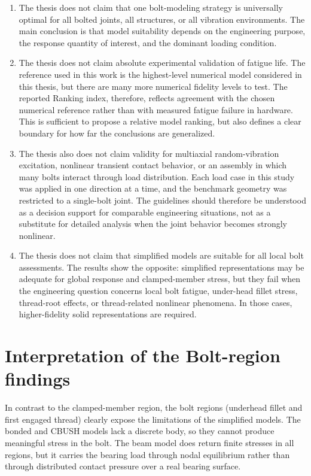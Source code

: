 \documentclass[a4paper,twoside]{bth}
\begin{document}
\begin{enumerate}
    \item The thesis does not claim that one bolt-modeling strategy is universally optimal for all bolted joints, all structures, or all vibration environments. The main conclusion is that model suitability depends on the engineering purpose, the response quantity of interest, and the dominant loading condition.
    \item The thesis does not claim absolute experimental validation of fatigue life. The reference used in this work is the highest-level numerical model considered in this thesis, but there are many more numerical fidelity levels to test. The reported Ranking index, therefore, reflects agreement with the chosen numerical reference rather than with measured fatigue failure in hardware. This is sufficient to propose a relative model ranking, but also defines a clear boundary for how far the conclusions are generalized.
    \item The thesis also does not claim validity for multiaxial random-vibration excitation, nonlinear transient contact behavior, or an assembly in which many bolts interact through load distribution. Each load case in this study was applied in one direction at a time, and the benchmark geometry was restricted to a single-bolt joint. The guidelines should therefore be understood as a decision support for comparable engineering situations, not as a substitute for detailed analysis when the joint behavior becomes strongly nonlinear.
    \item The thesis does not claim that simplified models are suitable for all local bolt assessments. The results show the opposite: simplified representations may be adequate for global response and clamped-member stress, but they fail when the engineering question concerns local bolt fatigue, under-head fillet stress, thread-root effects, or thread-related nonlinear phenomena. In those cases, higher-fidelity solid representations are required.
\end{enumerate}

\section{Interpretation of the Bolt-region findings}
In contrast to the clamped-member region, the bolt regions (underhead fillet and first engaged thread) clearly expose the limitations of the simplified models. The bonded and CBUSH models lack a discrete body, so they cannot produce meaningful stress in the bolt. The beam model does return finite stresses in all regions, but it carries the bearing load through nodal equilibrium rather than through distributed contact pressure over a real bearing surface.
\end{document}
